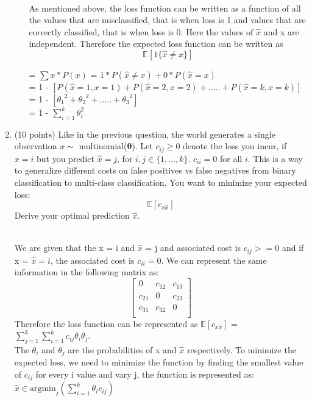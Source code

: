 \documentclass[a4paper]{article}
\theoremstyle{definition}
\renewcommand\vec[1]{\boldsymbol{#1}}
\def\E{\mathbb E}
\newenvironment{soln}{
    \leavevmode\color{blue}\ignorespaces
}{}
\begin{document}
\begin{enumerate}
\begin{enumerate}
    \begin{soln} \\As mentioned above, the loss function can be written as a function of all the values that are misclassified, that is when loss is 1 and values that are correctly classified, that is when loss is 0. Here the values of $\hat x$ and x are independent. Therefore the expected loss function can be written as \[\E[1\{\hat{x} \neq x\}]\] 
    \begin{center}
      		= $\sum x* P(x)$ = $1*P(\hat x \neq x) + 0*P(\hat x = x) $ \\
      		= 1 - $[P(\hat x = 1, x = 1) + P(\hat x = 2, x = 2) + ..... + P(\hat x = k, x = k)]$ \\
     		= 1 - $[{\theta_1}^{2} + {\theta_2}^{2} + ..... + {\theta_3}^{2}]$ \\
     		= 1 - $\sum_{i=1}^k \theta_i^{2}$
    \end{center}
    \end{soln}
\end{enumerate}

\item (10 points) Like in the previous question, the world generates a single observation $ {x}\sim$ multinomial($\vec \theta$). Let $c_{ij}\geq 0$ denote the loss you incur, if $x = i$ but you predict $\hat x = j$, for $i, j \in \{1, \ldots, k\}$. $c_{ii} = 0$ for all $i$. This is a way to generalize different costs on false positives vs false negatives from binary classification to multi-class classification. You want to minimize your expected loss: 
\[\E[c_{x\hat x}]\] 
Derive your optimal prediction $\hat x$. 
	\begin{soln} 
		\\We are given that the x = i and $\hat x$ = j and associated cost is $c_{ij} >= 0$ and if x = $\hat x = i$, the associated cost is $c_{ii} = 0$. We can represent the same information in the following matrix as: 
		\[\begin{bmatrix} 
			0 & c_{12} & c_{13} \\
			c_{21} & 0 & c_{23}\\
			c_{31} & c_{32} & 0 \\
		\end{bmatrix} \]
		Therefore the loss function can be represented as $\E[c_{x\hat x}]$ = $\sum_{j=1}^k \sum_{i=1}^k c_{ij} \theta_{i} \theta_{j}$.\\
		The $\theta_{i}$ and $\theta_{j}$ are the probabilities of x and $\hat x$ respectively. To minimize the expected loss, we need to minimize the function by finding the smallest value of $c_{ij}$ for every i value and vary j, the function is represented as: \\
		$\hat x \in \mathrm{argmin}_j (\sum_{i=1}^k \theta_i c_{ij})$
	\end{soln}


\end{enumerate}
\end{document}
